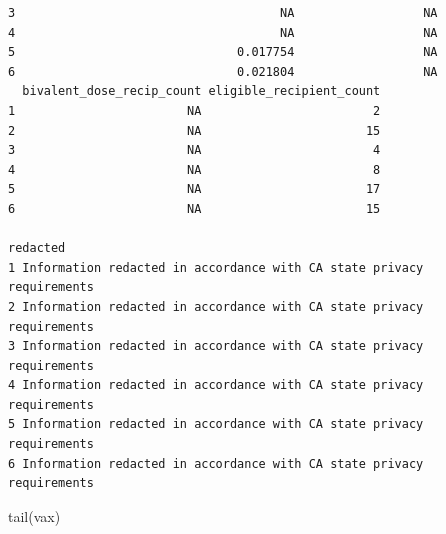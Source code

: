 \documentclass[
  letterpaper,
  DIV=11,
  numbers=noendperiod]{scrartcl}
\newenvironment{Shaded}{\begin{snugshade}}{\end{snugshade}}
\newcommand{\FunctionTok}[1]{\textcolor[rgb]{0.28,0.35,0.67}{#1}}
\newcommand{\NormalTok}[1]{\textcolor[rgb]{0.00,0.23,0.31}{#1}}
\begin{document}
\begin{verbatim}
3                                     NA                  NA
4                                     NA                  NA
5                               0.017754                  NA
6                               0.021804                  NA
  bivalent_dose_recip_count eligible_recipient_count
1                        NA                        2
2                        NA                       15
3                        NA                        4
4                        NA                        8
5                        NA                       17
6                        NA                       15
                                                               redacted
1 Information redacted in accordance with CA state privacy requirements
2 Information redacted in accordance with CA state privacy requirements
3 Information redacted in accordance with CA state privacy requirements
4 Information redacted in accordance with CA state privacy requirements
5 Information redacted in accordance with CA state privacy requirements
6 Information redacted in accordance with CA state privacy requirements
\end{verbatim}

\begin{Shaded}
\begin{Highlighting}[]
\FunctionTok{tail}\NormalTok{(vax)}
\end{Highlighting}
\end{Shaded}
\end{document}
